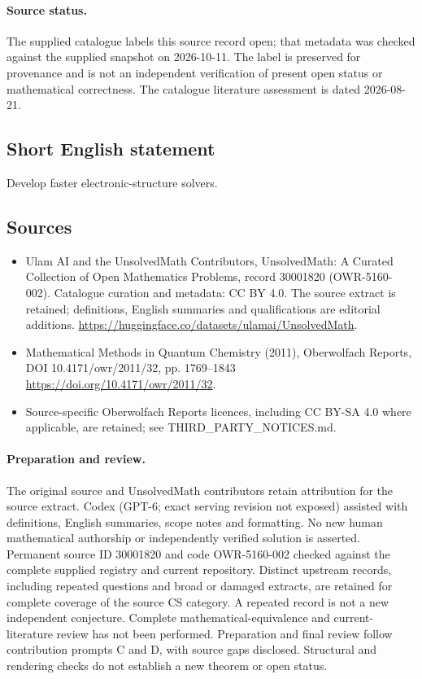 \documentclass[11pt]{article}
\begin{document}
\paragraph{Source status.}
The supplied catalogue labels this source record open; that metadata was checked against the supplied snapshot on 2026-10-11. The label is preserved for provenance and is not an independent verification of present open status or mathematical correctness. The catalogue literature assessment is dated 2026-08-21.
\subsection{Short English statement}
Develop faster electronic-structure solvers.
\subsection{Sources}
\begin{itemize}
\item[S1] Ulam AI and the UnsolvedMath Contributors, UnsolvedMath: A Curated Collection of Open Mathematics Problems, record 30001820 (OWR-5160-002). Catalogue curation and metadata: CC BY 4.0. The source extract is retained; definitions, English summaries and qualifications are editorial additions.
\url{https://huggingface.co/datasets/ulamai/UnsolvedMath}.
\item[S2] Mathematical Methods in Quantum Chemistry (2011), Oberwolfach Reports, DOI 10.4171/owr/2011/32, pp. 1769--1843
\url{https://doi.org/10.4171/owr/2011/32}.
\item Source-specific Oberwolfach Reports licences, including CC BY-SA 4.0 where applicable, are retained; see THIRD\_PARTY\_NOTICES.md.
\end{itemize}
\paragraph{Preparation and review.}
The original source and UnsolvedMath contributors retain attribution for the source extract. Codex (GPT-6; exact serving revision not exposed) assisted with definitions, English summaries, scope notes and formatting. No new human mathematical authorship or independently verified solution is asserted. Permanent source ID 30001820 and code OWR-5160-002 checked against the complete supplied registry and current repository. Distinct upstream records, including repeated questions and broad or damaged extracts, are retained for complete coverage of the source CS category. A repeated record is not a new independent conjecture. Complete mathematical-equivalence and current-literature review has not been performed. Preparation and final review follow contribution prompts C and D, with source gaps disclosed. Structural and rendering checks do not establish a new theorem or open status.
\label{end:30001820}
\end{document}
